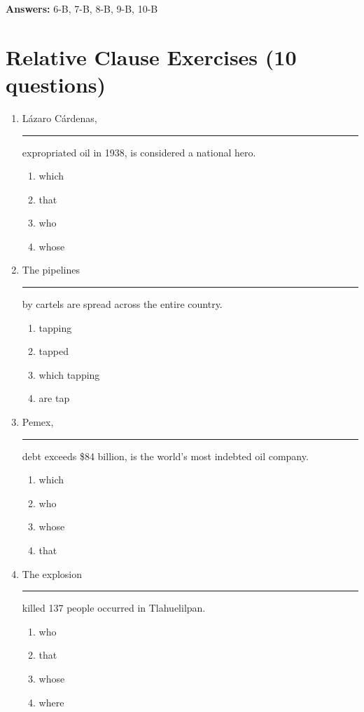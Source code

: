 \documentclass[10pt,a4paper]{article}
\begin{document}
\textbf{Answers:} 6-B, 7-B, 8-B, 9-B, 10-B

\section*{Relative Clause Exercises (10 questions)}

\begin{enumerate}[label=\textbf{\arabic*.}, leftmargin=*]

\item L\'azaro C\'ardenas, \rule{2cm}{0.4pt} expropriated oil in
1938, is considered a national hero.
\begin{enumerate}[label=(\Alph*)]
\item which \item that \item who \item whose
\end{enumerate}

\item The pipelines \rule{2cm}{0.4pt} by cartels are spread across
the entire country.
\begin{enumerate}[label=(\Alph*)]
\item tapping \item tapped \item which tapping \item are tap
\end{enumerate}

\item Pemex, \rule{2cm}{0.4pt} debt exceeds \$84 billion, is the
world's most indebted oil company.
\begin{enumerate}[label=(\Alph*)]
\item which \item who \item whose \item that
\end{enumerate}

\item The explosion \rule{2cm}{0.4pt} killed 137 people occurred in
Tlahuelilpan.
\begin{enumerate}[label=(\Alph*)]
\item who \item that \item whose \item where
\end{enumerate}


\end{enumerate}
\end{document}
